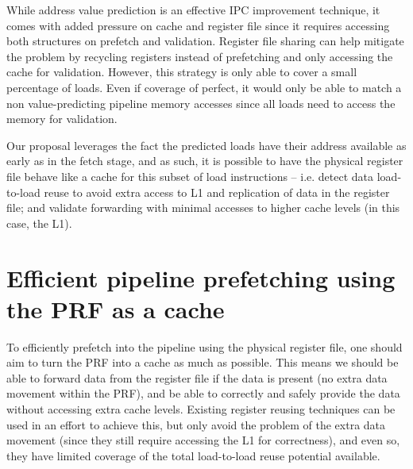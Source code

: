 \documentclass{sig-alternate}
\begin{document}
While address value prediction is an effective IPC improvement technique, it comes with added pressure on cache and register file since it requires accessing both structures on prefetch and validation. Register file sharing can help mitigate the problem by recycling registers instead of prefetching and only accessing the cache for validation. However, this strategy is only able to cover a small percentage of loads. Even if coverage of perfect, it would only be able to match a non value-predicting pipeline memory accesses since all loads need to access the memory for validation.  

Our proposal leverages the fact the predicted loads have their address available as early as in the fetch stage, and as such, it is possible to have the physical register file behave like a cache for this subset of load instructions -- i.e. detect data load-to-load reuse to avoid extra access to L1 and replication of data in the register file; and validate forwarding with minimal accesses to higher cache levels (in this case, the L1).



























\section{Efficient pipeline prefetching using the PRF as a cache}
To efficiently prefetch into the pipeline using the physical register file, one should aim to turn the PRF into a cache as much as possible. This means we should be able to forward data from the register file if the data is present (no extra data movement within the PRF), and be able to correctly and safely provide the data without accessing extra cache levels. Existing register reusing techniques can be used in an effort to achieve this, but only avoid the problem of the extra data movement (since they still require accessing the L1 for correctness), and even so, they have limited coverage of the total load-to-load reuse potential available.
\end{document}

